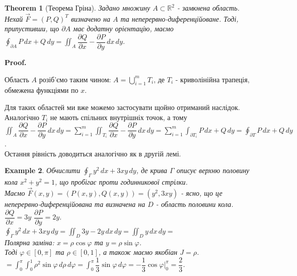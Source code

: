 \documentclass[a4paper, 10pt]{article}
\makeatletter
\def\departial#1#2{\dfrac{\partial {#1}}{\partial {#2}}}
\def\qed{$\blacksquare$}
\theoremstyle{theoremdd}
\newtheorem{theorem}{Theorem}[subsection]
\theoremstyle{theoremdd}
\theoremstyle{theoremdd}
\theoremstyle{theoremdd}
\newtheorem{example}[theorem]{Example}
\theoremstyle{theoremdd}
\theoremstyle{theoremdd}
\theoremstyle{theoremdd}
\theoremstyle{theoremdd}
\renewenvironment{proof}[1][Proof.\\]{\par
\pushQED{\hfill \qed}%
\normalfont \topsep6\p@\@plus6\p@\relax
\trivlist
\item\relax
{\bfseries
#1\@addpunct{.}}\hspace\labelsep\ignorespaces
}{%
\popQED\endtrivlist\@endpefalse
}
\makeatother
\begin{document}
\begin{theorem}[Теорема Гріна]
Задано множину $A \subset \mathbb{R}^2$ - замкнена область. Нехай $\vec{F} = (P,Q)^T$ визначено на $A$ та неперервно-диференційоване. Тоді, припустивши, що $\partial A$ має додатну орієнтацію, маємо\\
$\displaystyle\oint_{\partial A} P\,dx + Q\,dy = \iint_A \departial{Q}{x} - \departial{P}{y}\,dx\,dy$.
\end{theorem}

\begin{proof}
Область $A$ розіб'ємо таким чином:  $A = \displaystyle\bigcup_{i=1}^m T_i$, де $T_i$ - криволінійна трапеція, обмежена функціями по $x$.
\begin{figure}[H]
\centering
{}
\end{figure}
Для таких областей ми вже можемо застосувати щойно отриманий наслідок.\\
Аналогічно $T_i$ не мають спільних внутрішніх точок, а тому\\
$\displaystyle\iint_A \departial{Q}{x} - \departial{P}{y}\,dx\,dy = \sum_{i=1}^m \iint_{T_i} \departial{Q}{x} - \departial{P}{y}\,dx\,dy = \sum_{i=1}^m \int_{\partial T_i} P\,dx+Q\,dy = \oint_{\partial T} P\,dx + Q\,dy$.\\
Остання рівність доводиться аналогічно як в другій лемі.
\end{proof}

\begin{example}
Обчислити $\displaystyle\oint_\Gamma y^2\,dx + 3xy\,dy$, де крива $\Gamma$ описує верхню половину кола $x^2+y^2 = 1$, що пробігає проти годинникової стрілки.\\
Маємо $\vec{F}(x,y) = (P(x,y),Q(x,y)) = (y^2,3xy)$ - ясно, що це неперервно-диференційована та визначена на $D$ - область половини кола.\\
$\departial{Q}{x} = 3y$ \hspace{1cm} $\departial{P}{y} = 2y$.\\
$\displaystyle\oint_\Gamma y^2\,dx + 3xy\,dy = \iint_D 3y - 2y\,dx\,dy = \iint_D y\,dx\,dy =$\\
Полярна заміна: $x = \rho \cos \varphi$ та $y = \rho \sin \varphi$.\\
Тоді $\varphi \in [0,\pi]$ та $\rho \in [0,1]$, а також маємо якобіан $J = \rho$.\\
$= \displaystyle\int_0^{\pi} \int_0^1 \rho^2 \sin \varphi \,d\rho\,d\varphi = \int_0^{\pi} \dfrac{1}{3} \sin \varphi\,d\varphi = -\dfrac{1}{3} \cos \varphi\Big|_{0}^{\pi} = \dfrac{2}{3}$.
\end{example}
\end{document}
